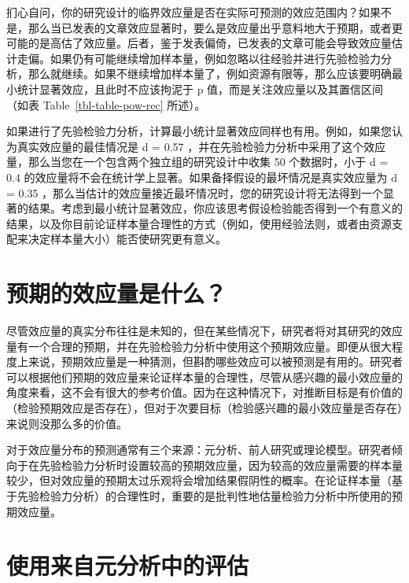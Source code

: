 \documentclass[
  letterpaper,
  DIV=11,
  numbers=noendperiod]{scrreprt}
\begin{document}
扪心自问，你的研究设计的临界效应量是否在实际可预测的效应范围内？如果不是，那么当已发表的文章效应显著时，要么是效应量出乎意料地大于预期，或者更可能的是高估了效应量。后者，鉴于发表偏倚，已发表的文章可能会导致效应量估计走偏。如果仍有可能继续增加样本量，例如忽略以往经验并进行先验检验力分析，那么就继续。如果不继续增加样本量了，例如资源有限等，那么应该要明确最小统计显著效应，且此时不应该拘泥于
p 值，而是关注效应量以及其置信区间（如表 Table~\ref{tbl-table-pow-rec}
所述）。

如果进行了先验检验力分析，计算最小统计显著效应同样也有用。例如，如果您认为真实效应量的最佳情况是
d = 0.57
，并在先验检验力分析中采用了这个效应量，那么当您在一个包含两个独立组的研究设计中收集
50 个数据时，小于 d = 0.4
的效应量将不会在统计学上显著。如果备择假设的最坏情况是真实效应量为 d =
0.35
，那么当估计的效应量接近最坏情况时，您的研究设计将无法得到一个显著的结果。考虑到最小统计显著效应，你应该思考假设检验能否得到一个有意义的结果，以及你目前论证样本量合理性的方式（例如，使用经验法则，或者由资源支配来决定样本量大小）能否使研究更有意义。

\hypertarget{ux9884ux671fux7684ux6548ux5e94ux91cfux662fux4ec0ux4e48}{%
\section{预期的效应量是什么？}\label{ux9884ux671fux7684ux6548ux5e94ux91cfux662fux4ec0ux4e48}}

尽管效应量的真实分布往往是未知的，但在某些情况下，研究者将对其研究的效应量有一个合理的预期，并在先验检验力分析中使用这个预期效应量。即便从很大程度上来说，预期效应量是一种猜测，但斟酌哪些效应可以被预测是有用的。研究者可以根据他们预期的效应量来论证样本量的合理性，尽管从感兴趣的最小效应量的角度来看，这不会有很大的参考价值。因为在这种情况下，对推断目标是有价值的（检验预期效应是否存在），但对于次要目标（检验感兴趣的最小效应量是否存在）来说则没那么多的价值。

对于效应量分布的预测通常有三个来源：元分析、前人研究或理论模型。研究者倾向于在先验检验力分析时设置较高的预期效应量，因为较高的效应量需要的样本量较少，但对效应量的预期太过乐观将会增加结果假阴性的概率。在论证样本量（基于先验检验力分析）的合理性时，重要的是批判性地估量检验力分析中所使用的预期效应量。

\hypertarget{ux4f7fux7528ux6765ux81eaux5143ux5206ux6790ux4e2dux7684ux8bc4ux4f30}{%
\section{使用来自元分析中的评估}\label{ux4f7fux7528ux6765ux81eaux5143ux5206ux6790ux4e2dux7684ux8bc4ux4f30}}
\end{document}
